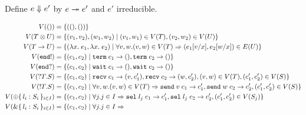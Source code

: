 \begin{definition}
  Define $e \stackrel{}\Downarrow e'$ by $e \stackrel{}{\twoheadrightarrow} e'$ and $e'$
  irreducible.
\end{definition}
\begin{align*}
  V (\TUnit) & = \{ (\EUnit, \EUnit) \}
  \\
  V (\TPair TU) & = \{ (v_1, v_2), (w_1, w_2) \mid (v_1, w_1) \in V (T), (v_2, w_2) \in V (U) \}
  \\
  V (\TFun TU) &= \{ (\ELam xe_1, \ELam xe_2) \mid \forall v, w. (v, w) \in V (T) \Rightarrow (e_1[v/x], e_2[w/x]) \in E (U)  \}
  \\
  V (\TEnd!) &= \{ (c_1, c_2) \mid
                       \reduce{\ETerm c_1}{\EUnit}, \reduce{\ETerm
                       c_2}{\EUnit} \}
  \\
  V (\TEnd?) &= \{ (c_1, c_2) \mid
               \reduce{\EWait c_1}{\EUnit}, \reduce{\EWait
                       c_2}{\EUnit} \}
  \\
  V (\TIn TS) &= \{ (c_1, c_2) \mid
                \reduce{\ERecv c_1}{(v, c_1')}, 
                \reduce{\ERecv c_2}{(w, c_2')},
                (v,w) \in V(T),
                (c_1', c_2') \in V (S) \}
  \\
  V (\TOut TS) &= \{ (c_1, c_2) \mid \forall v, w. (v,w) \in V(T)
                \Rightarrow
                \reduce{\ESend v c_1}{c_1'}, 
                 \reduce{\ESend w c_2}{c_2'},
                 (c_1', c_2') \in V(S) \}
  \\
  V (\TSelect{l_i: S_i}) &=  \{ (c_1, c_2) \mid \forall j. j \in I
                           \Rightarrow
                           \reduce{\ESelect{l_j} c_1 }{c_1'}, 
                           \reduce{\ESelect{l_j} c_2 }{c_2'},
                           (c_1', c_2') \in V(S_j)
                           \}
  \\
  V (\TCase{l_i: S_i})
             &= \{ (c_1, c_2) \mid \forall j. j \in I \Rightarrow

\end{align*}
